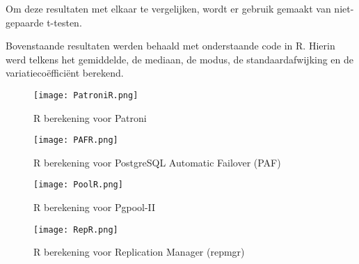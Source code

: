 \begin{table}[!h]
    \centering
    \caption{Statistieken requirements}
    \label{table:Statistieken requirements}
\end{table}

Om deze resultaten met elkaar te vergelijken, wordt er gebruik gemaakt van niet-gepaarde t-testen.





Bovenstaande resultaten werden behaald met onderstaande code in R. Hierin werd telkens het gemiddelde, de mediaan, de modus, de standaardafwijking en de variatiecoëfficiënt berekend.

\begin{figure}[!h]
    \centering
    \texttt{[image: PatroniR.png]}
    \caption{R berekening voor Patroni}
    \label{fig:R berekening voor Patroni}
\end{figure}

\begin{figure}[!h]
    \centering
    \texttt{[image: PAFR.png]}
    \caption{R berekening voor PostgreSQL Automatic Failover (PAF)}
    \label{fig:R berekening voor PostgreSQL Automatic Failover (PAF)}
\end{figure}

\begin{figure}[!h]
    \centering
    \texttt{[image: PoolR.png]}
    \caption{R berekening voor Pgpool-II}
    \label{fig:R berekening voor Pgpool-II}
\end{figure}

\begin{figure}[!h]
    \centering
    \texttt{[image: RepR.png]}
    \caption{R berekening voor Replication Manager (repmgr)}
    \label{fig:R berekening voor Replication Manager (repmgr)}
\end{figure}

